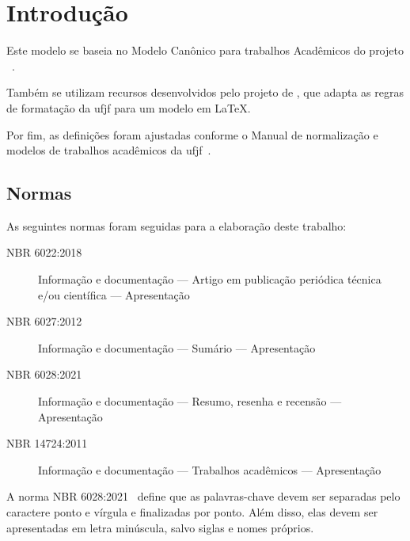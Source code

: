 \section{Introdução}%
\label{sec:introducao}

Este modelo se baseia no Modelo Canônico para trabalhos Acadêmicos do projeto \abnTeX~\cite{abntex2:2024}.

Também se utilizam recursos desenvolvidos pelo projeto de , que adapta as regras de formatação da \gls{ufjf} para um modelo em \LaTeX.

Por fim, as definições foram ajustadas conforme o Manual de normalização e modelos de trabalhos acadêmicos da \gls{ufjf}~\cite{cdd:2023}.

\subsection{Normas}%
\label{sec:normas}

As seguintes normas foram seguidas para a elaboração deste trabalho:

\begin{description}
    \item[NBR 6022:2018] Informação e documentação --- Artigo em publicação periódica técnica e/ou científica --- Apresentação~\cite{nbr6022:2018}
    \item[NBR 6027:2012] Informação e documentação --- Sumário --- Apresentação~\cite{nbr6027:2012}
    \item[NBR 6028:2021] Informação e documentação --- Resumo, resenha e recensão --- Apresentação~\cite{nbr6028:2021}
    \item[NBR 14724:2011] Informação e documentação --- Trabalhos acadêmicos --- Apresentação~\cite{nbr14724:2011}
\end{description}

A norma NBR 6028:2021~\cite{nbr6028:2021} define que as palavras-chave devem ser separadas pelo caractere ponto e vírgula e finalizadas por ponto.
Além disso, elas devem ser apresentadas em letra minúscula, salvo siglas e nomes próprios.
